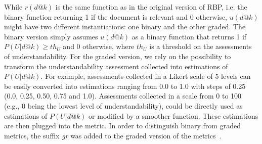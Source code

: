 While $r(d@k)$ is the same function as in the original version of RBP, i.e. the binary function returning 1 if the document is relevant and 0 otherwise, $u(d@k)$ might have two different instantiations: one binary and the other graded. The binary version simply assumes $u(d@k)$ as a binary function that returns 1 if $P(U|d@k) \geq th_U$ and 0 otherwise, where $th_U$ is a threshold on the assessments of understandability. 
For the graded version, we rely on the possibility to transform the understandability assessment collected into estimations of $P(U|d@k)$.
For example, assessments collected in a Likert scale of 5 levels can be easily converted into estimations ranging from 0.0 to 1.0 with steps of 0.25 (0.0, 0.25, 0.50, 0.75 and 1.0).
Assessments collected in a scale from 0 to 100 (e.g., 0 being the lowest level of understandability), could be directly used as estimations of $P(U|d@k)$ or modified by a smoother function.
These estimations are then plugged into the metric. In order to distinguish binary from graded metrics, the suffix \textit{gr} was added to the graded version of the metrics~\cite{zuccon16}.



